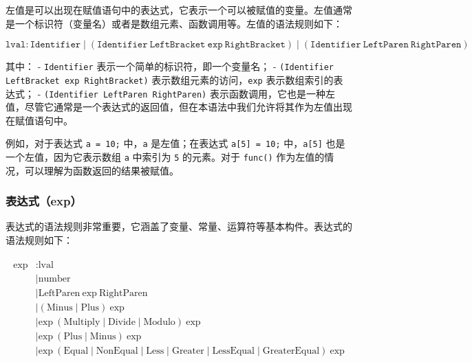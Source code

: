 \documentclass[../main.tex]{subfiles}
\begin{document}
左值是可以出现在赋值语句中的表达式，它表示一个可以被赋值的变量。左值通常是一个标识符（变量名）或者是数组元素、函数调用等。左值的语法规则如下：

\[
\texttt{lval} \colon \texttt{Identifier} \mid (\texttt{Identifier} \ \texttt{LeftBracket} \ \texttt{exp} \ \texttt{RightBracket}) \mid (\texttt{Identifier} \ \texttt{LeftParen} \ \texttt{RightParen})
\]

其中：
- \texttt{Identifier} 表示一个简单的标识符，即一个变量名；
- \texttt{(Identifier LeftBracket exp RightBracket)} 表示数组元素的访问，\texttt{exp} 表示数组索引的表达式；
- \texttt{(Identifier LeftParen RightParen)} 表示函数调用，它也是一种左值，尽管它通常是一个表达式的返回值，但在本语法中我们允许将其作为左值出现在赋值语句中。

例如，对于表达式 \texttt{a = 10;} 中，\texttt{a} 是左值；在表达式 \texttt{a[5] = 10;} 中，\texttt{a[5]} 也是一个左值，因为它表示数组 \texttt{a} 中索引为 \texttt{5} 的元素。对于 \texttt{func()} 作为左值的情况，可以理解为函数返回的结果被赋值。


\subsubsection{表达式（exp）}

表达式的语法规则非常重要，它涵盖了变量、常量、运算符等基本构件。表达式的语法规则如下：

\begin{gather*}
	\begin{aligned}
		\text{exp} & \colon  \text{lval}                                                                                                                                    \\
		           & \mid \text{number}                                                                                                                                     \\
		           & \mid \text{LeftParen} \ \text{exp} \ \text{RightParen}                                                                                                 \\
		           & \mid (\text{Minus} \mid \text{Plus}) \ \text{exp}                                                                                                      \\
		           & \mid \text{exp} \ (\text{Multiply} \mid \text{Divide} \mid \text{Modulo}) \ \text{exp}                                                                 \\
		           & \mid \text{exp} \ (\text{Plus} \mid \text{Minus}) \ \text{exp}                                                                                         \\
		           & \mid \text{exp} \ (\text{Equal} \mid \text{NonEqual} \mid \text{Less} \mid \text{Greater} \mid \text{LessEqual} \mid \text{GreaterEqual}) \ \text{exp}
	\end{aligned}
\end{gather*}
\end{document}
